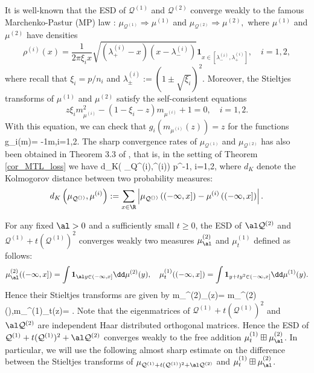 \documentclass[aos,preprint]{imsart}
\newcommand{\Qa}{\mathcal Q^{(1)}}
\newcommand{\Qb}{\mathcal Q^{(2)}}
\newcommand{\mua}{\mu^{(1)}}
\newcommand{\mub}{\mu^{(2)}}
\begin{document}
It is well-known that the ESD of $\Qa$ and $\Qb$ converge weakly to the famous Marchenko-Pastur (MP) law \cite{MP}: $\mu_{\Qa}\Rightarrow \mu^{(1)}$ and $\mu_{\Qb}\Rightarrow \mu^{(2)},$ where $\mu^{(1)}$ and $\mu^{(2)}$ have densities
 $$\rho^{(i)}(x)= \frac1{2\pi \xi_i x}{\sqrt{\left(\lambda_+^{(i)}-x\right)\left(x-\lambda_-^{(i)}\right)}}\mathbf 1_{x\in [\lambda_-^{(i)},\lambda_+^{(i)}]},\quad i=1,2,$$
 where recall that $\xi_i={p}/{n_i}$ and $\lambda_{\pm}^{(i)}:=(1\pm \sqrt{\xi_i})^2.$
Moreover, the Stieltjes transforms of $\mu^{(1)}$ and $\mu^{(2)}$ satisfy the self-consistent equations
$$z\xi_i m^2_{\mu^{(i)}} - (1-\xi_i - z)m_{\mu^{(i)}} +1 =0,\quad i=1,2.$$ 
With this equation, we can check that $g_i(m_{\mu^{(i)}}(z))=z$ for the functions
\be\label{g_i} g_i(m)= -\frac1m,\quad i=1,2.\ee
The sharp convergence rates of $\mu_{\Qa}$ and $\mu_{\Qb}$ has also been obtained in Theorem 3.3 of \cite{PY}, that is, in the setting of Theorem \ref{cor_MTL_loss} we have
\be\label{Kol_dist}
d_K\left( \mu_{\cal Q^{(i)}},\mu^{(i)}\right) \prec  p^{-1}, \quad i=1,2,
\ee
where $d_K$ denote the Kolmogorov distance between two probability measures:
$$d_K\left( \mu_{\cal Q^{(i)}},\mu^{(i)}\right):=\sum_{x\in \R} \left| \mu_{\cal Q^{(i)}}\left((-\infty,x]\right)-\mu^{(i)}\left((-\infty,x]\right)\right|.$$

For any fixed $\al>0$ and a sufficiently small $t\ge 0$, the ESD of $\al\Qb$ and $\Qa+t(\Qa)^2$ converges weakly two measures $\mub_\al$ and $\mua_t$ defined as follows:
$$\mub_\al((-\infty,x])= \int \mathbf 1_{\al y \in (-\infty, x]} \dd \mub(y),\quad \mua_t((-\infty,x])= \int \mathbf 1_{y+ ty^2 \in (-\infty, x]} \dd \mua(y).$$
Hence their Stieltjes transforms are given by
\be\label{def_mt}
m_{\mub_\al}(z)= m_{\mu^{(2)}}\left(\right),\quad m_{\mua_t}(z)= \int \frac{\dd \mua(x)}{x+tx^2 - z}.
\ee
Note that the eigenmatrices of $\Qa+t(\Qa)^2$ and $\al \Qb$ are independent Haar distributed orthogonal matrices. Hence the ESD of $\Qa+t(\Qa)^2 + \al \Qb$ converges weakly to the free addition $\mua_t\boxplus \mub_\al$. In particular, we will use the following almost sharp estimate on the difference between the Stieltjes transforms of $\mu_{\Qa+t(\Qa)^2 + \al \Qb}$ and  $\mua_t\boxplus \mub_\al$.
\end{document}
